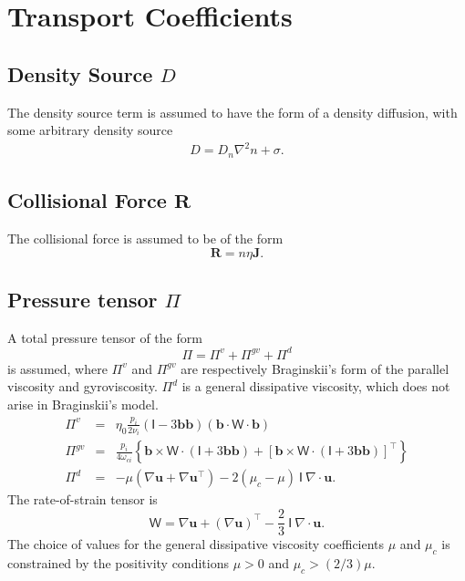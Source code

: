 \documentclass[draft]{book}
\renewcommand{\vec}[1]{\ensuremath{\mathbf{#1}}}
\newcommand{\tensor}[1]{\mathsf{#1}}
\newcommand{\R}{\vec{R}}
\renewcommand{\u}{\vec{u}}
\renewcommand{\j}{\vec{J}}
\renewcommand{\P}{\tensor{\Pi}}
\renewcommand{\b}{\vec{b}}
\newcommand{\W}{\tensor{W}}
\newcommand{\grad}[1]{\nabla #1}
\renewcommand{\div}[1]{\nabla \cdot #1}
\begin{document}
\section{Transport Coefficients \label{sec:transport_coefficients}}


\subsection{Density Source $D$}

The density source term is assumed to have the form of a density
diffusion, with some arbitrary density source
\begin{eqnarray}
  D = D_n \nabla^2 n + \sigma.
\end{eqnarray}


\subsection{Collisional Force $\R$}

The collisional force is assumed to be of the form
\begin{equation}
  \label{eq:collisional_force}
  \R = n \eta \j.
\end{equation}


\subsection{Pressure tensor $\P$ \label{sec:pressure_tensor}}
A total pressure tensor of the form
\begin{equation}
  \P = \P^{v} + \P^{gv} + \P^d
\end{equation}
is assumed, where $\P^v$ and $\P^{gv}$ are respectively Braginskii's
form of the parallel viscosity and gyroviscosity.  $\P^d$ is a general
dissipative viscosity, which does not arise in Braginskii's model.
\begin{eqnarray}
  \P^{v} & = & \eta_0 \frac{p_i}{2 \nu_i} 
    \left( \tensor{I} - 3 \b \b \right)
    \left( \b \cdot \W \cdot \b \right)
  \\
  \label{eq:gyroviscosity}
  \P^{gv} & = & \frac{p_i}{4 \omega_{c i}} \left\{
    \b \times \W \cdot (\tensor{I} + 3 \b\b) +
    \left[\b \times \W \cdot (\tensor{I} + 3 \b\b)\right]^\top
    \right\}
  \\
  \label{eq:general_viscosity}
  \P^{d} & = & -\mu \left(\grad{\u} + \grad{\u}^\top\right)
   -2 \left(\mu_c - \mu \right)\ \tensor{I}\ \div{\u}.
\end{eqnarray}
The rate-of-strain tensor is
\begin{displaymath}
  \W = \nabla \u + (\nabla \u)^\top 
  - \frac{2}{3}\ \tensor{I}\ \div{\u}.
\end{displaymath}
The choice of values for the general dissipative viscosity
coefficients $\mu$ and $\mu_c$ is constrained by the positivity
conditions $\mu > 0$ and $\mu_c > (2/3)\mu$.
\end{document}
